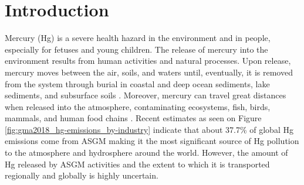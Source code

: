 
\chapter{Introduction}
Mercury (Hg) is a severe health hazard in the environment and in people, especially for fetuses and young children\cite{gibb_mercury_2014}. The release of mercury into the environment results from human activities and natural processes. Upon release, mercury moves between the air, soils, and waters until, eventually, it is removed from the system through burial in coastal and deep ocean sediments, lake sediments, and subsurface soils \cite{esdaile_mercury_2018}. Moreover, mercury can travel great distances when released into the atmosphere, contaminating ecosystems, fish, birds, mammals, and human food chains \cite{esdaile_mercury_2018}. Recent estimates as seen on Figure \ref{fig:gma2018_hg-emissions_by-industry} indicate that about 37.7\% of global Hg emissions come from ASGM making it the most significant source of Hg pollution to the atmosphere and hydrosphere around the world\cite{united_nations_environment_programme_technical_2019}. However, the amount of Hg released by ASGM activities and the extent to which it is transported regionally and globally is highly uncertain. 

